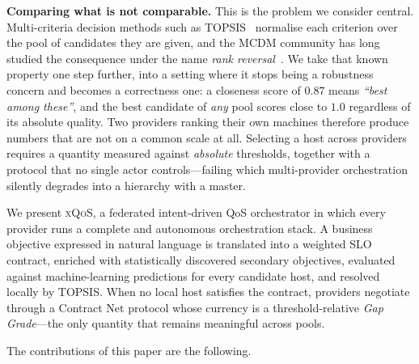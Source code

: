 \documentclass[conference]{IEEEtran}
\begin{document}
\textbf{Comparing what is not comparable.} This is the problem we consider
central. Multi-criteria decision methods such as TOPSIS~\cite{hwang1981}
normalise each criterion over the pool of candidates they are given, and the
MCDM community has long studied the consequence under the name \emph{rank
reversal}~\cite{belton1983,garciacascales2012}. We take that known property
one step further, into a setting where it stops being a robustness concern
and becomes a correctness one: a closeness score of $0.87$ means
\emph{``best among these''}, and the best candidate of \emph{any} pool scores
close to $1.0$ regardless of its absolute quality. Two providers ranking
their own machines therefore produce numbers that are not on a common scale
at all. Selecting a host across providers requires a quantity measured
against \emph{absolute} thresholds, together with a protocol that no single
actor controls---failing which multi-provider orchestration silently
degrades into a hierarchy with a master.

We present \textsc{xQoS}, a federated intent-driven QoS orchestrator in which
every provider runs a complete and autonomous orchestration stack. A business
objective expressed in natural language is translated into a weighted SLO
contract, enriched with statistically discovered secondary objectives,
evaluated against machine-learning predictions for every candidate host, and
resolved locally by TOPSIS. When no local host satisfies the contract,
providers negotiate through a Contract Net protocol whose currency is a
threshold-relative \emph{Gap Grade}---the only quantity that remains
meaningful across pools.

The contributions of this paper are the following.
\end{document}
